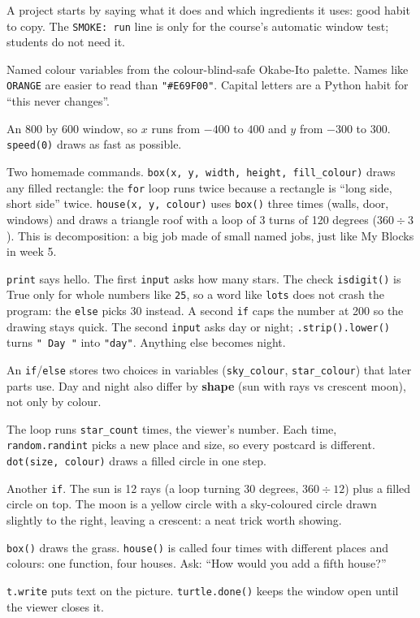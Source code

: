 \documentclass[level=1,teacher]{kidscode}
\begin{document}
\begin{description}[leftmargin=0pt,itemsep=5pt,font=\bfseries]
\item[Top comments.] A project starts by saying what it does and which ingredients it uses: good
  habit to copy. The \texttt{SMOKE: run} line is only for the course's automatic window test; students do not need it.
\item[PART 1: Colours.] Named colour variables from the colour-blind-safe Okabe-Ito palette.
  Names like \texttt{ORANGE} are easier to read than \texttt{"\#E69F00"}. Capital letters are a
  Python habit for \enquote{this never changes}.
\item[PART 2: Screen and turtle.] An 800 by 600 window, so $x$ runs from $-400$ to $400$ and $y$
  from $-300$ to $300$. \texttt{speed(0)} draws as fast as possible.
\item[PART 3: Functions.] Two homemade commands. \texttt{box(x, y, width, height, fill\_colour)}
  draws any filled rectangle: the \texttt{for} loop runs twice because a rectangle is \enquote{long
  side, short side} twice. \texttt{house(x, y, colour)} uses \texttt{box()} three times (walls, door,
  windows) and draws a triangle roof with a loop of 3 turns of 120 degrees ($360 \div 3$). This is
  decomposition: a big job made of small named jobs, just like My Blocks in week 5.
\item[PART 4: Greet and ask.] \texttt{print} says hello. The first \texttt{input} asks how many stars.
  The check \texttt{isdigit()} is True only for whole numbers like \texttt{25}, so a word like
  \texttt{lots} does not crash the program: the \texttt{else} picks 30 instead. A second \texttt{if}
  caps the number at 200 so the drawing stays quick. The second \texttt{input} asks day or night;
  \texttt{.strip().lower()} turns \texttt{" Day "} into \texttt{"day"}. Anything else becomes night.
\item[PART 5: Choose colours.] An \texttt{if}/\texttt{else} stores two choices in variables
  (\texttt{sky\_colour}, \texttt{star\_colour}) that later parts use. Day and night also differ by
  \textbf{shape} (sun with rays vs crescent moon), not only by colour.
\item[PART 6: Random stars.] The loop runs \texttt{star\_count} times, the viewer's number. Each time,
  \texttt{random.\allowbreak randint} picks a new place and size, so every postcard is different.
  \texttt{dot(size, colour)} draws a filled circle in one step.
\item[PART 7: Sun or moon.] Another \texttt{if}. The sun is 12 rays (a loop turning 30 degrees,
  $360 \div 12$) plus a filled circle on top. The moon is a yellow circle with a sky-coloured circle
  drawn slightly to the right, leaving a crescent: a neat trick worth showing.
\item[PART 8: Grass and houses.] \texttt{box()} draws the grass. \texttt{house()} is called four times
  with different places and colours: one function, four houses. Ask: \enquote{How would you add a fifth house?}
\item[PART 9: Message.] \texttt{t.write} puts text on the picture. \texttt{turtle.done()} keeps the
  window open until the viewer closes it.
\end{description}
\end{document}
